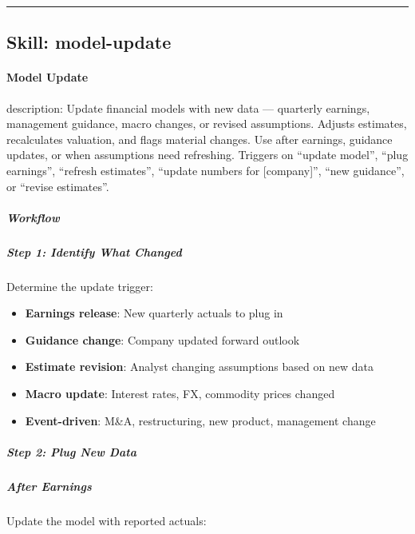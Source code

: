 \documentclass[11pt]{article}
\begin{document}
\vspace{0.8em}\hrule\vspace{0.8em}

\subsection{Skill: model-update}\label{file:earnings-reviewer-skills-model-update-SKILL-md}

\paragraph{Model Update}\mbox{}\par

description: Update financial models with new data — quarterly earnings, management guidance, macro changes, or revised assumptions. Adjusts estimates, recalculates valuation, and flags material changes. Use after earnings, guidance updates, or when assumptions need refreshing. Triggers on ``update model'', ``plug earnings'', ``refresh estimates'', ``update numbers for [company]'', ``new guidance'', or ``revise estimates''.


\subparagraph{Workflow}\mbox{}\par

\subparagraph{Step 1: Identify What Changed}\mbox{}\par

Determine the update trigger:

\begin{itemize}[leftmargin=*,itemsep=2pt,topsep=2pt]
\item {} \textbf{Earnings release}: New quarterly actuals to plug in
\item {} \textbf{Guidance change}: Company updated forward outlook
\item {} \textbf{Estimate revision}: Analyst changing assumptions based on new data
\item {} \textbf{Macro update}: Interest rates, FX, commodity prices changed
\item {} \textbf{Event-driven}: M\&A, restructuring, new product, management change
\end{itemize}

\subparagraph{Step 2: Plug New Data}\mbox{}\par

\subparagraph{After Earnings}\mbox{}\par
Update the model with reported actuals:
\end{document}
